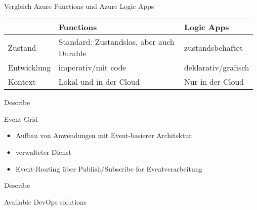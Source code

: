 \documentclass{scrartcl}
\newenvironment{flashcard}[2][]{%
    #1
    \vfill
    \centerline{\Large{#2}}
    \vfill
\newpage
}
{\newpage}
\begin{document}
    \begin{flashcard}[\ ]{Vergleich Azure Functions und Azure Logic Apps}
        \begin{tabular}{l|p{34mm}p{34mm}}
                 & \textbf{Functions}                                             & \textbf{Logic Apps} \\
          \hline
          Zustand & Standard: Zustandslos, aber auch Durable                  & zustandsbehaftet                                                                         \\
          Entwicklung & imperativ/mit code                                        & deklarativ/grafisch                                                               \\
          Kontext  & Lokal und in der Cloud                                    & Nur in der Cloud                                                                  \\
        \end{tabular}
    \end{flashcard}

    \begin{flashcard}[Describe]{Event Grid}
        \begin{itemize}
            \item Aufbau von Anwendungen mit Event-basierer Architektur
            \item verwalteter Dienst
            \item Event-Routing über Publish/Subscribe for Eventverarbeitung
        \end{itemize}

    \end{flashcard}

    \begin{flashcard}[Describe]{Available DevOps solutions}

    \end{flashcard}
\end{document}
